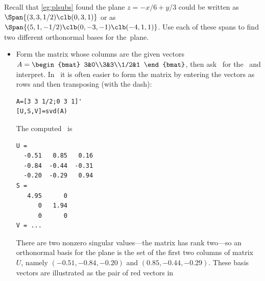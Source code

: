 \begin{example} \label{eg:orthospan}
Recall that \cref{eg:plsubs} found the plane \(z=-x/6+y/3\) could be written as \(\Span\{(3,3,1/2)\clb (0,3,1)\}\) or as \(\Span\{(5,1,-1/2)\clb (0,-3,-1)\clb (-4,1,1)\}\).
Use each of these spans to find two different orthonormal bases for the~plane.
\begin{solution} 
\begin{itemize}
\item Form the matrix whose columns are the given vectors
\(A=\begin{bmat} 3&0\\3&3\\1/2&1 \end{bmat}\),
then ask \script\ for the \svd\ and interpret.
In \script\ it is often easier to form the matrix by entering the vectors as rows and then transposing (with the dash):
\begin{verbatim}
A=[3 3 1/2;0 3 1]'
[U,S,V]=svd(A)
\end{verbatim}
\setbox\ajrqrbox\hbox{}%
\marginajrbox%
The computed \svd\ is \twodp
\begin{verbatim}
U =
  -0.51   0.85   0.16
  -0.84  -0.44  -0.31
  -0.20  -0.29   0.94
S =
   4.95      0
      0   1.94
      0      0
V = ...
\end{verbatim}

\begin{figbox}{ {}}%
There are two nonzero singular values---the matrix has rank two---so an orthonormal basis for the plane is the set of the first two columns of matrix~\(U\), namely  \((-0.51,-0.84,-0.20)\) and \((0.85,-0.44,-0.29)\).
These basis vectors are illustrated as the pair of red vectors in 
\reParshape
\end{figbox}


\end{itemize}
\end{solution}
\end{example}
